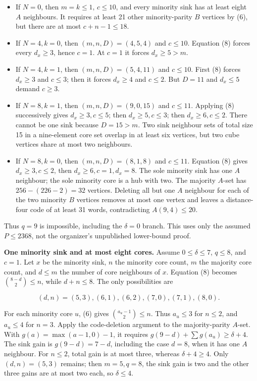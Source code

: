 \documentclass[11pt,a4paper]{article}
\providecommand{\tightlist}{\setlength{\itemsep}{0pt}\setlength{\parskip}{0pt}}
\begin{document}
\begin{itemize}
\tightlist
\item
  If \(N=0\), then \(m=k\le1\), \(c\le10\), and every minority sink has at least eight \(A\) neighbours. It requires at least 21 other minority-parity \(B\) vertices by (6), but there are at most \(c+n-1\le18\).
\item
  If \(N=4,k=0\), then \((m,n,D)=(4,5,4)\) and \(c\le10\). Equation (8) forces every \(d_x\ge3\), hence \(c=1\). At \(c=1\) it forces \(d_x\ge5>m\).
\item
  If \(N=4,k=1\), then \((m,n,D)=(5,4,11)\) and \(c\le10\). First (8) forces \(d_x\ge3\) and \(c\le3\); then it forces \(d_x\ge4\) and \(c\le2\). But \(D=11\) and \(d_x\le5\) demand \(c\ge3\).
\item
  If \(N=8,k=1\), then \((m,n,D)=(9,0,15)\) and \(c\le11\). Applying (8) successively gives \(d_x\ge3,c\le5\); then \(d_x\ge5,c\le3\); then \(d_x\ge6,c\le2\). There cannot be one sink because \(D=15>m\). Two sink neighbour sets of total size 15 in a nine-element core set overlap in at least six vertices, but two cube vertices share at most two neighbours.
\item
  If \(N=8,k=0\), then \((m,n,D)=(8,1,8)\) and \(c\le11\). Equation (8) gives \(d_x\ge3,c\le2\), then \(d_x\ge6,c=1,d_x=8\). The sole minority sink has one \(A\) neighbour; the sole minority core is a hub with two. The majority \(A\)-set has \(256-(226-2)=32\) vertices. Deleting all but one \(A\) neighbour for each of the two minority \(B\) vertices removes at most one vertex and leaves a distance-four code of at least 31 words, contradicting \(A(9,4)\le20\).
\end{itemize}

Thus \(q=9\) is impossible, including the \(\delta=0\) branch. This uses only the assumed \(P\le2368\), not the organizer's unpublished lower-bound proof.

\textbf{One minority sink and at most eight cores.} Assume \(0\le\delta\le7\), \(q\le8\), and \(c=1\). Let \(x\) be the minority sink, \(n\) the minority core count, \(m\) the majority core count, and \(d\le m\) the number of core neighbours of \(x\). Equation (8) becomes \(\binom{8-d}{2}\le n\), while \(d+n\le8\). The only possibilities are

\[
(d,n)=(5,3),(6,1),(6,2),(7,0),(7,1),(8,0).
\]

For each minority core \(u\), (6) gives \(\binom{a_u-1}{2}\le n\). Thus \(a_u\le3\) for \(n\le2\), and \(a_u\le4\) for \(n=3\). Apply the code-deletion argument to the majority-parity \(A\)-set. With \(g(a)=\max(a-1,0)-1\), it requires \(g(9-d)+\sum g(a_u)\ge\delta+4\). The sink gain is \(g(9-d)=7-d\), including the case \(d=8\), when it has one \(A\) neighbour. For \(n\le2\), total gain is at most three, whereas \(\delta+4\ge4\). Only \((d,n)=(5,3)\) remains; then \(m=5,q=8\), the sink gain is two and the other three gains are at most two each, so \(\delta\le4\).
\end{document}
